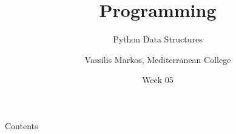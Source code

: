 \documentclass[aspectratio=169, 12pt, xcolor=table]{beamer}
\title{Programming}
\subtitle{Python Data Structures}
\date{Week 05}
\author{Vassilis Markos, Mediterranean College}
\newcommand{\ohref}[1]{\href{#1}{\texttt{#1}}}
\begin{document}
	\begin{frame}
		\titlepage
	\end{frame}

	\begin{frame}{Contents}
		\tableofcontents
	\end{frame}

%	
%	
%
\end{document}
